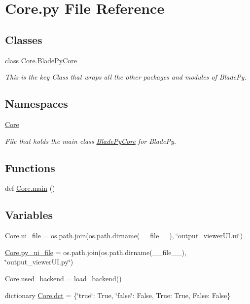 \hypertarget{a00011}{}\section{Core.\+py File Reference}
\label{a00011}
\subsection*{Classes}
\begin{DoxyCompactItemize}
\item 
class \hyperlink{a00078}{Core.\+Blade\+Py\+Core}
\begin{DoxyCompactList}\small\item\em This is the key Class that wraps all the other packages and modules of Blade\+Py. \end{DoxyCompactList}\end{DoxyCompactItemize}
\subsection*{Namespaces}
\begin{DoxyCompactItemize}
\item 
 \hyperlink{a00050}{Core}
\begin{DoxyCompactList}\small\item\em File that holds the main class \hyperlink{a00078}{Blade\+Py\+Core} for Blade\+Py. \end{DoxyCompactList}\end{DoxyCompactItemize}
\subsection*{Functions}
\begin{DoxyCompactItemize}
\item 
def \hyperlink{a00050_abbe2fb717a0d4efddde9090f186bd64b}{Core.\+main} ()
\end{DoxyCompactItemize}
\subsection*{Variables}
\begin{DoxyCompactItemize}
\item 
\hyperlink{a00050_a1363a763ded79810023c205b7ed824f0}{Core.\+ui\+\_\+file} = os.\+path.\+join(os.\+path.\+dirname(\+\_\+\+\_\+file\+\_\+\+\_\+), \char`\"{}output\+\_\+viewer\+U\+I.\+ui\char`\"{})
\item 
\hyperlink{a00050_a4cd2f45c63964d86002d7a37c7141973}{Core.\+py\+\_\+ui\+\_\+file} = os.\+path.\+join(os.\+path.\+dirname(\+\_\+\+\_\+file\+\_\+\+\_\+), \char`\"{}output\+\_\+viewer\+U\+I.\+py\char`\"{})
\item 
\hyperlink{a00050_a5233d27f0fe842cb39f926c4360e63dd}{Core.\+used\+\_\+backend} = load\+\_\+backend()
\item 
dictionary \hyperlink{a00050_a929c2310eb32ddd6da7fa2835f7f96d1}{Core.\+dct} = \{\char`\"{}true\char`\"{}\+: True, \char`\"{}false\char`\"{}\+: False, True\+: True, False\+: False\}
\end{DoxyCompactItemize}
